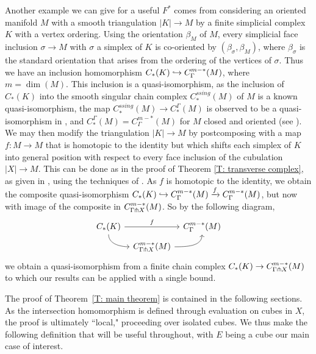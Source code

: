 Another example we can give for a useful $F^*$ comes from considering an oriented manifold $M$ with a smooth triangulation $|K|\to M$ by a finite simplicial complex $K$ with a vertex ordering.
Using the orientation $\beta_M$ of $M$, every simplicial face inclusion $\sigma\to M$ with $\sigma$ a simplex of $K$ is co-oriented by $(\beta_\sigma,\beta_M)$, where $\beta_\sigma$ is the standard orientation that arises from the ordering of the vertices of $\sigma$.
Thus we have an inclusion homomorphism $C_*(K)\hookrightarrow C^{m-*}_\Gamma(M)$, where $m = \dim(M)$.
This inclusion is a quasi-isomorphism, as the inclusion of $C_*(K)$ into the smooth singular chain complex $C_*^{ssing}(M)$ of $M$ is a known quasi-isomorphism, the map $C_*^{ssing}(M) \to C_*^\Gamma(M)$ is observed to be a quasi-isomorphism in \cite[Section 10]{Lipy14}, and $C_*^\Gamma(M)=C^{m-*}_\Gamma(M)$ for $M$ closed and oriented (see \cite[Section 12]{Lipy14}).
We may then modify the triangulation $|K|\to M$ by postcomposing with a map $f \colon M\to M$ that is homotopic to the identity but which shifts each simplex of $K$ into general position with respect to every face inclusion of the cubulation $|X|\to M$.
This can be done as in the proof of Theorem \ref{T: transverse complex}, as given in \cite{FMS-foundations}, using the techniques of \cite[Section 2.3]{GuPo74}.
As $f$ is homotopic to the identity, we obtain the composite quasi-isomorphism $C_*(K)\hookrightarrow C^{m-*}_\Gamma(M) \xrightarrow{f} C^{m-*}_\Gamma(M)$, but now with image of the composite in $C^{m-*}_{\Gamma \pitchfork X}(M)$. So by the following diagram,
\begin{equation*}
	\begin{tikzcd}[column sep=tiny, row sep=tiny]
		C_*(K) \arrow[rr, "f"] \arrow[dr, out=-90, in=180]& & C^{m-*}_{\Gamma}(M) \\
		& C^{m-*}_{\Gamma \pf X}(M) \arrow[ur, out=0, in =-90] &
	\end{tikzcd}
\end{equation*}
we obtain a quasi-isomorphism from a finite chain complex $C_*(K)\to C^{m-*}_{\Gamma \pitchfork X}(M)$ to which our results can be applied with a single bound.

\bigskip

The proof of Theorem~\ref{T: main theorem} is contained in the following sections.
As the intersection homomorphism is defined through evaluation on cubes in $X$, the proof
is ultimately ``local," proceeding over isolated cubes.
We thus make the following definition that will be useful throughout, with $E$ being a cube our main case of interest.


